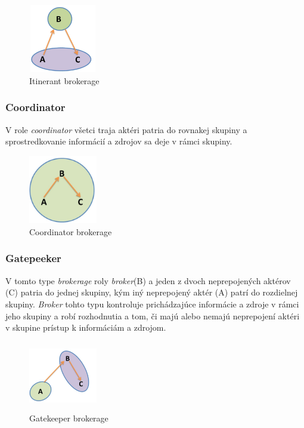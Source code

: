 \documentclass[slovak,master,public,dept460,male,cpdeclaration,oneside]{diploma}
\begin{document}
\begin{figure}[H]
\centering
\includegraphics[width=3cm, height=3cm]{figures/itineran}
\caption{Itinerant brokerage}
\end{figure}

\subsubsection{Coordinator}
V role \textit{coordinator} všetci traja aktéri patria do rovnakej skupiny a sprostredkovanie informácií a zdrojov sa deje v rámci skupiny. 

\begin{figure}[H]
\centering
\includegraphics[width=3cm, height=3cm]{figures/coordinator}
\caption{Coordinator brokerage}
\end{figure}

\subsubsection{Gatepeeker}
V tomto type \textit{brokerage} roly \textit{broker}(B) a jeden z dvoch neprepojených aktérov (C) patria do jednej skupiny, kým iný neprepojený aktér (A) patrí do rozdielnej skupiny. \textit{Broker} tohto typu kontroluje prichádzajúce informácie a zdroje v rámci jeho skupiny a robí rozhodnutia a tom, či majú alebo nemajú neprepojení aktéri v skupine prístup k informáciám a zdrojom. 

\begin{figure}[H]
\centering
\includegraphics[width=3cm, height=3cm]{figures/gatepeeker}
\caption{Gatekeeper brokerage}
\end{figure}
\end{document}
